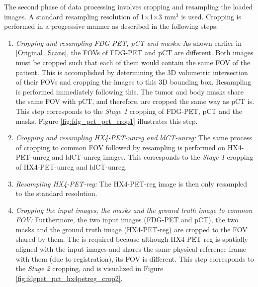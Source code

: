 The second phase of data processing involves cropping and resampling the loaded images. A standard resampling resolution of 1$\times$1$\times$3 mm$^3$ is used. Cropping is performed in a progressive manner as described in the following steps: 

\begin{enumerate}
    \item \textit{Cropping and resampling FDG-PET, pCT and masks:} As shown earlier in \ref{Original_Scans}, the FOVs of FDG-PET and pCT are different. Both images must be cropped such that each of them would contain the same FOV of the patient. This is accomplished by determining the 3D volumetric intersection of their FOVs and cropping the images to this 3D bounding box. Resampling is performed immediately following this. The tumor and body masks share the same FOV with pCT, and therefore, are cropped the same way as pCT is. This step corresponds to the \textit{Stage 1} cropping of FDG-PET, pCT and the masks. Figure \ref{fig:fdg_pet_pct_crop1} illustrates this step.

    \item \textit{Cropping and resampling HX4-PET-unreg and ldCT-unreg:} The same process of cropping to common FOV followed by resampling is performed on HX4-PET-unreg and ldCT-unreg images. This corresponds to the \textit{Stage 1} cropping of HX4-PET-unreg and ldCT-unreg.

    \item \textit{Resampling HX4-PET-reg:} The HX4-PET-reg image is then only resampled to the standard resolution.

    \item \textit{Cropping the input images, the masks and the ground truth image to common FOV:} Furthermore, the two input images (FDG-PET and pCT), the two masks and the ground truth image (HX4-PET-reg) are cropped to the FOV shared by them. The is required because although HX4-PET-reg is spatially aligned with the input images and shares the same physical reference frame with them (due to registration), its FOV is different. This step corresponds to the \textit{Stage 2} cropping, and is visualized in Figure \ref{fig:fdgpet_pct_hx4petreg_crop2}.
\end{enumerate}

